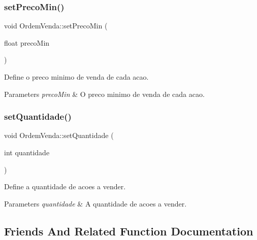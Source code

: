\subsubsection{\texorpdfstring{set\+Preco\+Min()}{setPrecoMin()}}
{\footnotesize\ttfamily void Ordem\+Venda\+::set\+Preco\+Min (\begin{DoxyParamCaption}\item[{float}]{preco\+Min }\end{DoxyParamCaption})\hspace{0.3cm}{\ttfamily [inline]}}



Define o preco minimo de venda de cada acao. 


\begin{DoxyParams}{Parameters}
{\em preco\+Min} & O preco minimo de venda de cada acao. \\
\hline
\end{DoxyParams}
\hypertarget{class_ordem_venda_a44040292fc692df291cc909d486031de}{}\label{class_ordem_venda_a44040292fc692df291cc909d486031de} 
\subsubsection{\texorpdfstring{set\+Quantidade()}{setQuantidade()}}
{\footnotesize\ttfamily void Ordem\+Venda\+::set\+Quantidade (\begin{DoxyParamCaption}\item[{int}]{quantidade }\end{DoxyParamCaption})\hspace{0.3cm}{\ttfamily [inline]}}



Define a quantidade de acoes a vender. 


\begin{DoxyParams}{Parameters}
{\em quantidade} & A quantidade de acoes a vender. \\
\hline
\end{DoxyParams}


\subsection{Friends And Related Function Documentation}
\hypertarget{class_ordem_venda_a61ee7a51b949c83f00e5a192bb41e911}{}\label{class_ordem_venda_a61ee7a51b949c83f00e5a192bb41e911} 
